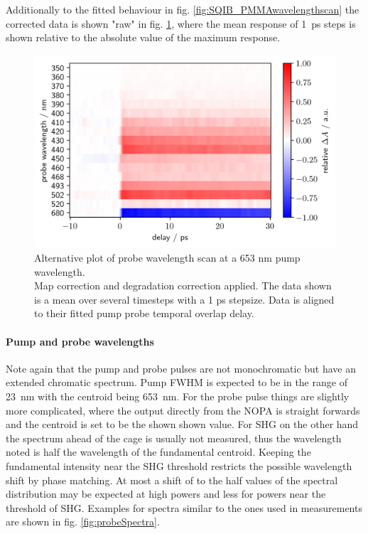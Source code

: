 \documentclass[twoside,openright]{scrreprt}
\begin{document}
Additionally to the fitted behaviour in fig. \ref{fig:SQIB_PMMAwavelengthscan} the corrected data is shown "raw" in fig. \ref{fig:SQIB_PMMA_rawWavs}, where the mean response of \SI{1}{\pico\second} steps is shown relative to the absolute value of the maximum response.
\begin{figure}[htp]
\centering
\includegraphics[scale=1]{images/RawishDataWavelengthScanSHG.png}
\caption{Alternative plot of probe wavelength scan at a 653 nm pump wavelength.\\Map correction and degradation correction applied. The data shown is a mean over several timesteps with a 1 ps stepsize. Data is aligned to their fitted pump probe temporal overlap delay.\label{fig:SQIB_PMMA_rawWavs}}
\end{figure}
\paragraph{Pump and probe wavelengths}
Note again that the pump and probe pulses are not monochromatic but have an extended chromatic spectrum. Pump FWHM is expected to be in the range of \SI{23}{\nano\meter} with the centroid being \SI{653}{\nano\meter}. For the probe pulse things are slightly more complicated, where the output directly from the NOPA is straight forwards and the centroid is set to be the shown shown value. For SHG on the other hand the spectrum ahead of the cage is usually not measured, thus the wavelength noted is half the wavelength of the fundamental centroid. Keeping the fundamental intensity near the SHG threshold restricts the possible wavelength shift by phase matching. At most a shift of to the half values of the spectral distribution may be expected at high powers and less for powers near the threshold of SHG. Examples for spectra similar to the ones used in measurements are shown in fig. \ref{fig:probeSpectra}.
\end{document}
